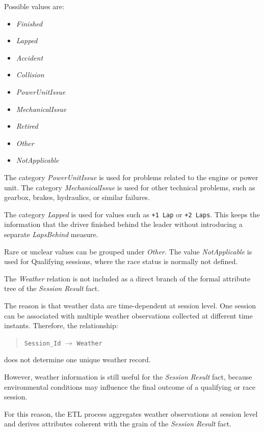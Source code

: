 \documentclass[a4paper,11pt]{article}
\begin{document}
	Possible values are:
	
	\begin{itemize}
		\item \textit{Finished}
		\item \textit{Lapped}
		\item \textit{Accident}
		\item \textit{Collision}
		\item \textit{PowerUnitIssue}
		\item \textit{MechanicalIssue}
		\item \textit{Retired}
		\item \textit{Other}
		\item \textit{NotApplicable}
	\end{itemize}
	
	The category \textit{PowerUnitIssue} is used for problems related to the engine or power
	unit. The category \textit{MechanicalIssue} is used for other technical problems, such as
	gearbox, brakes, hydraulics, or similar failures.
	
	The category \textit{Lapped} is used for values such as \texttt{+1 Lap} or
	\texttt{+2 Laps}. This keeps the information that the driver finished behind the leader
	without introducing a separate \textit{LapsBehind} measure.
	
	Rare or unclear values can be grouped under \textit{Other}. The value
	\textit{NotApplicable} is used for Qualifying sessions, where the race status is normally
	not defined.
	

	
	The \textit{Weather} relation is not included as a direct branch of the formal attribute
	tree of the \textit{Session Result} fact.
	
	The reason is that weather data are time-dependent at session level. One session can be
	associated with multiple weather observations collected at different time instants.
	Therefore, the relationship:
	
	\begin{quote}
		\texttt{Session\_Id} $\rightarrow$ \texttt{Weather}
	\end{quote}
	
	does not determine one unique weather record.
	
	However, weather information is still useful for the \textit{Session Result} fact, because
	environmental conditions may influence the final outcome of a qualifying or race session.
	
	For this reason, the ETL process aggregates weather observations at session level and
	derives attributes coherent with the grain of the \textit{Session Result} fact.
	
\end{document}
